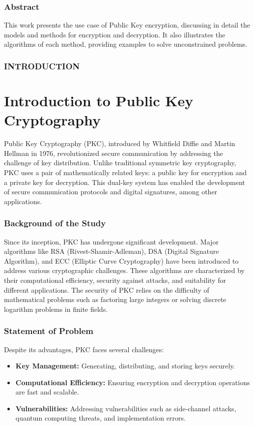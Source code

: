 \documentclass{beamer}
\begin{document}
\begin{frame}
    \frametitle{Abstract}
    This work presents the use case of Public Key encryption, discussing in detail the models and methods for encryption and decryption. It also illustrates the algorithms of each method, providing examples to solve unconstrained problems.
\end{frame}


\begin{frame}
\frametitle{INTRODUCTION}

\section{Introduction to Public Key Cryptography}
Public Key Cryptography (PKC), introduced by Whitfield Diffie and Martin Hellman in 1976, revolutionized secure communication by addressing the challenge of key distribution. Unlike traditional symmetric key cryptography, PKC uses a pair of mathematically related keys: a public key for encryption and a private key for decryption. This dual-key system has enabled the development of secure communication protocols and digital signatures, among other applications.
\end{frame}

\begin{frame}
\frametitle{Background of the Study}
Since its inception, PKC has undergone significant development. Major algorithms like RSA (Rivest-Shamir-Adleman), DSA (Digital Signature Algorithm), and ECC (Elliptic Curve Cryptography) have been introduced to address various cryptographic challenges. These algorithms are characterized by their computational efficiency, security against attacks, and suitability for different applications. The security of PKC relies on the difficulty of mathematical problems such as factoring large integers or solving discrete logarithm problems in finite fields.
\end{frame}
\begin{frame}
\frametitle{Statement of Problem}
Despite its advantages, PKC faces several challenges:
\begin{itemize}
    \item \textbf{Key Management:} Generating, distributing, and storing keys securely.
    \item \textbf{Computational Efficiency:} Ensuring encryption and decryption operations are fast and scalable.
    \item \textbf{Vulnerabilities:} Addressing vulnerabilities such as side-channel attacks, quantum computing threats, and implementation errors.
\end{itemize}
\end{frame}
\end{document}
